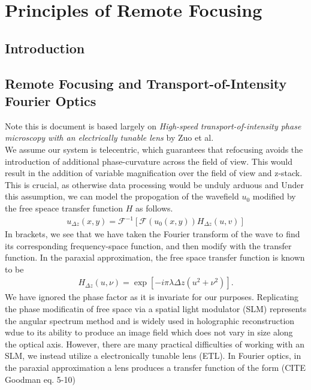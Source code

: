 \maketitle
\section{Principles of Remote Focusing}
\subsection{Introduction}

\subsection{Remote Focusing and Transport-of-Intensity Fourier Optics}
Note this is document is based largely on \textit{High-speed transport-of-intensity phase
microscopy with an electrically tunable lens} by Zuo et al.\\
We assume our system is telecentric, which guarantees that refocusing avoids the introduction of additional phase-curvature across the field of view. This would result in the addition of variable magnification over the field of view and z-stack. This is crucial, as otherwise data processing would be unduly arduous and Under this assumption, we can model the propogation of the wavefield $u_0$ modified by the free speace transfer function $H$ as follows. 
\begin{gather}
	u_{\Delta z}(x,y) = \mathcal{F}^{-1}\left [ \mathcal{F}(u_0(x,y))H_{\Delta z}(u,v)\right]
\end{gather}
In brackets, we see that we have taken the Fourier transform of the wave to find its corresponding frequency-space function, and then modify with the transfer function. In the paraxial approximation, the free space transfer function is known to be
\begin{gather}
	H_{\Delta z}(u,\nu) = \exp\left[-i \pi \lambda \Delta z (u^2 + \nu^2)\right].
\end{gather}
We have ignored the phase factor as it is invariate for our purposes. Replicating the phase modificatin of free space via a spatial light modulator (SLM) represents the angular spectrum method and is widely used in holographic reconstruction wdue to its ability to produce an image field which does not vary in size along the optical axis. However, there are many practical difficulties of working with an SLM, we instead utilize a electronically tunable lens (ETL). In Fourier optics, in the paraxial approximation a lens produces a transfer function of the form (CITE Goodman eq. 5-10)
